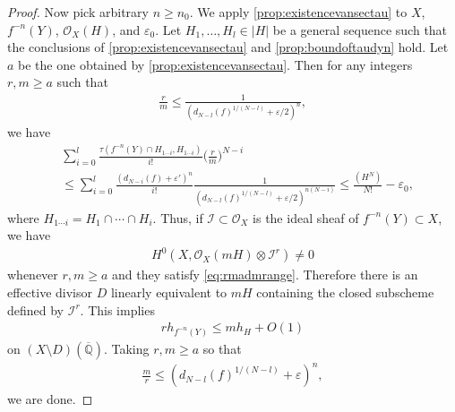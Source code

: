 \documentclass[12pt]{amsart}
\theoremstyle{plain}
\theoremstyle{definition}
\numberwithin{equation}{section}
\def\QQ{\overline{\mathbb Q}}
\def\O{{ \mathcal{O}}}
\def\I{{ \mathcal{I}}}
\newcommand{\e}{\varepsilon}
\begin{document}
\begin{proof}
Now pick arbitrary $n \geq n_{0}$.
We apply \cref{prop:existencevansectau} to $X$, $f^{-n}(Y)$, $\O_{X}(H)$, and $\e_{0}$.
Let $H_{1}, \dots, H_{l} \in |H|$ be a general sequence such that the conclusions of
\cref{prop:existencevansectau}  and \cref{prop:boundoftaudyn} hold.
Let $a$ be the one obtained by \cref{prop:existencevansectau}.
Then for any integers $r,m \geq a$ such that
\begin{align}
\frac{r}{m} \leq \frac{1}{( d_{N-l}(f)^{1/(N-l)}+ \e/2 )^{n} }, \label{eq:rmadmrange}
\end{align}
we have
\begin{align}
&\sum_{i=0}^{l} \frac{\tau(f^{-n}(Y)\cap H_{1\cdots i}, H_{1\cdots i}  )}{i!} \bigg( \frac{r}{m} \bigg)^{N-i}\\
&\leq 
\sum_{i=0}^{l} \frac{( d_{N-i}(f)+ \e')^{n}}{i!}  \frac{1}{( d_{N-l}(f)^{1/(N-l)}+ \e/2 )^{n(N-i)} } \leq \frac{(H^{N})}{N!} - \e_{0},
\end{align}
where $H_{1\cdots i} = H_{1} \cap \cdots \cap H_{i}$.
Thus, if $\I \subset \O_{X}$ is the ideal sheaf of $f^{-n}(Y) \subset X$, we have
\begin{align}
H^{0}(X, \O_{X}(mH) \otimes \I^{r}) \neq 0
\end{align}
whenever $r, m \geq a$ and they satisfy \cref{eq:rmadmrange}.
Therefore there is an effective divisor $D$ linearly equivalent to $mH$ containing 
the closed subscheme defined by $\I^{r}$.
This implies 
\begin{align}
rh_{f^{-n}(Y)} \leq mh_{H} + O(1)
\end{align}
on $(X \setminus D)(\QQ)$.
Taking $r,m \geq a$ so that 
\begin{align}
\frac{m}{r} \leq (d_{N-l}(f)^{1/(N-l)} + \e)^{n},
\end{align} 
we are done.
\end{proof}
\end{document}
